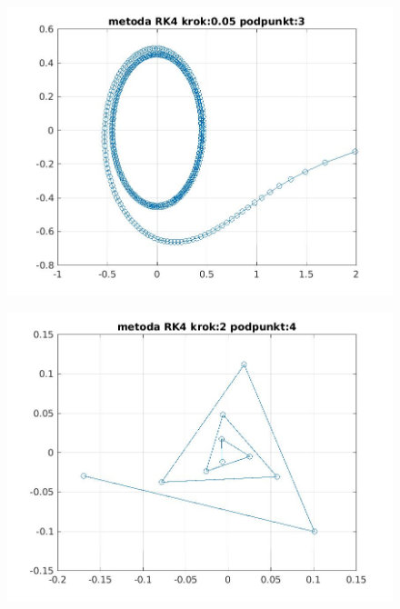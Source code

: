 \documentclass[a4paper, 11pt]{article}
\begin{document}
\begin{figure}[H]
\centering
\includegraphics[width = 15cm]{2d/metoda RK4 krok:0,05 podpunkt:3.jpg}
\end{figure}

\begin{figure}[H]
\centering
\includegraphics[width = 15cm]{2d/metoda RK4 krok:2 podpunkt:4.jpg}
\end{figure}
\end{document}
